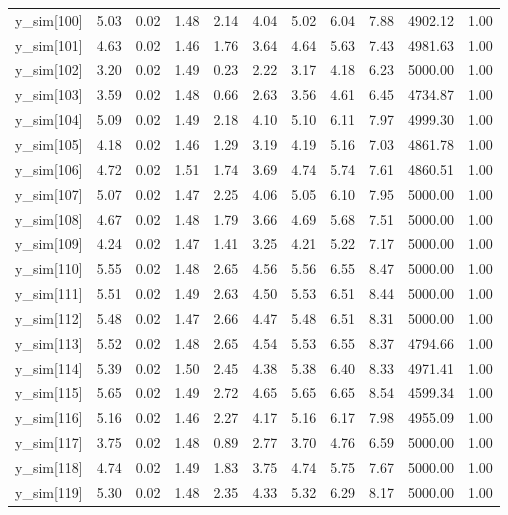 \begin{table}[ht]
\begin{tabular}{rrrrrrrrrrr}
  y\_sim[100] & 5.03 & 0.02 & 1.48 & 2.14 & 4.04 & 5.02 & 6.04 & 7.88 & 4902.12 & 1.00 \\ 
  y\_sim[101] & 4.63 & 0.02 & 1.46 & 1.76 & 3.64 & 4.64 & 5.63 & 7.43 & 4981.63 & 1.00 \\ 
  y\_sim[102] & 3.20 & 0.02 & 1.49 & 0.23 & 2.22 & 3.17 & 4.18 & 6.23 & 5000.00 & 1.00 \\ 
  y\_sim[103] & 3.59 & 0.02 & 1.48 & 0.66 & 2.63 & 3.56 & 4.61 & 6.45 & 4734.87 & 1.00 \\ 
  y\_sim[104] & 5.09 & 0.02 & 1.49 & 2.18 & 4.10 & 5.10 & 6.11 & 7.97 & 4999.30 & 1.00 \\ 
  y\_sim[105] & 4.18 & 0.02 & 1.46 & 1.29 & 3.19 & 4.19 & 5.16 & 7.03 & 4861.78 & 1.00 \\ 
  y\_sim[106] & 4.72 & 0.02 & 1.51 & 1.74 & 3.69 & 4.74 & 5.74 & 7.61 & 4860.51 & 1.00 \\ 
  y\_sim[107] & 5.07 & 0.02 & 1.47 & 2.25 & 4.06 & 5.05 & 6.10 & 7.95 & 5000.00 & 1.00 \\ 
  y\_sim[108] & 4.67 & 0.02 & 1.48 & 1.79 & 3.66 & 4.69 & 5.68 & 7.51 & 5000.00 & 1.00 \\ 
  y\_sim[109] & 4.24 & 0.02 & 1.47 & 1.41 & 3.25 & 4.21 & 5.22 & 7.17 & 5000.00 & 1.00 \\ 
  y\_sim[110] & 5.55 & 0.02 & 1.48 & 2.65 & 4.56 & 5.56 & 6.55 & 8.47 & 5000.00 & 1.00 \\ 
  y\_sim[111] & 5.51 & 0.02 & 1.49 & 2.63 & 4.50 & 5.53 & 6.51 & 8.44 & 5000.00 & 1.00 \\ 
  y\_sim[112] & 5.48 & 0.02 & 1.47 & 2.66 & 4.47 & 5.48 & 6.51 & 8.31 & 5000.00 & 1.00 \\ 
  y\_sim[113] & 5.52 & 0.02 & 1.48 & 2.65 & 4.54 & 5.53 & 6.55 & 8.37 & 4794.66 & 1.00 \\ 
  y\_sim[114] & 5.39 & 0.02 & 1.50 & 2.45 & 4.38 & 5.38 & 6.40 & 8.33 & 4971.41 & 1.00 \\ 
  y\_sim[115] & 5.65 & 0.02 & 1.49 & 2.72 & 4.65 & 5.65 & 6.65 & 8.54 & 4599.34 & 1.00 \\ 
  y\_sim[116] & 5.16 & 0.02 & 1.46 & 2.27 & 4.17 & 5.16 & 6.17 & 7.98 & 4955.09 & 1.00 \\ 
  y\_sim[117] & 3.75 & 0.02 & 1.48 & 0.89 & 2.77 & 3.70 & 4.76 & 6.59 & 5000.00 & 1.00 \\ 
  y\_sim[118] & 4.74 & 0.02 & 1.49 & 1.83 & 3.75 & 4.74 & 5.75 & 7.67 & 5000.00 & 1.00 \\ 
  y\_sim[119] & 5.30 & 0.02 & 1.48 & 2.35 & 4.33 & 5.32 & 6.29 & 8.17 & 5000.00 & 1.00 \\ 

\end{tabular}
\end{table}

